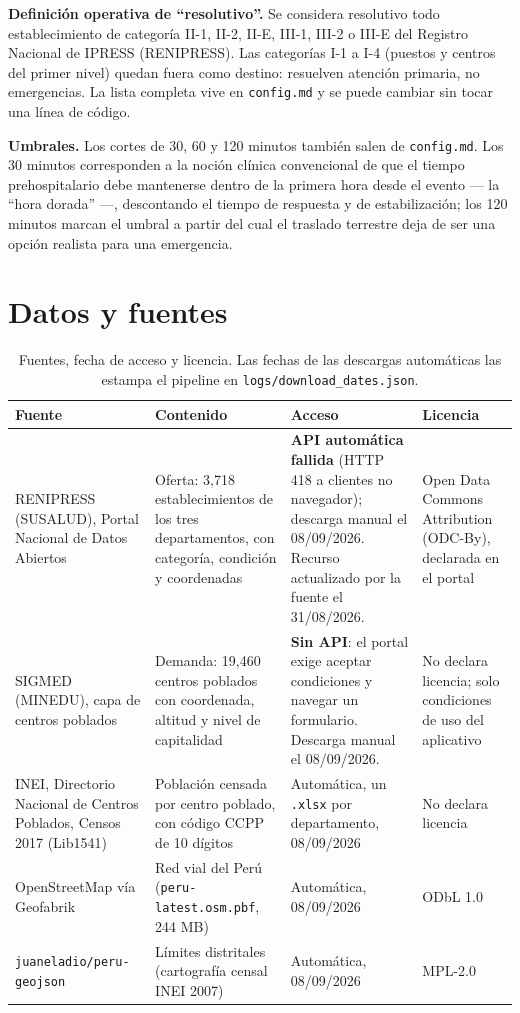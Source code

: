 \documentclass[11pt,a4paper]{article}
\begin{document}
\textbf{Definición operativa de ``resolutivo''.} Se considera resolutivo todo
establecimiento de categoría II-1, II-2, II-E, III-1, III-2 o III-E del
Registro Nacional de IPRESS (RENIPRESS). Las categorías I-1 a I-4 (puestos y
centros del primer nivel) quedan fuera como destino: resuelven atención
primaria, no emergencias. La lista completa vive en \texttt{config.md} y se
puede cambiar sin tocar una línea de código.

\textbf{Umbrales.} Los cortes de 30, 60 y 120 minutos también salen de
\texttt{config.md}. Los 30 minutos corresponden a la noción clínica
convencional de que el tiempo prehospitalario debe mantenerse dentro de la
primera hora desde el evento --- la ``hora dorada'' ---, descontando el tiempo
de respuesta y de estabilización; los 120 minutos marcan el umbral a partir
del cual el traslado terrestre deja de ser una opción realista para una
emergencia.

\section{Datos y fuentes}

\begin{table}[H]
\centering
\caption{Fuentes, fecha de acceso y licencia. Las fechas de las descargas
automáticas las estampa el pipeline en \texttt{logs/download\_dates.json}.}
\label{tab:fuentes}
\footnotesize
\begin{tabular}{p{2.9cm}p{3.5cm}p{4.6cm}p{3.5cm}}
\toprule
Fuente & Contenido & Acceso & Licencia \\
\midrule
RENIPRESS (SUSALUD), Portal Nacional de Datos Abiertos
& Oferta: 3{,}718 establecimientos de los tres departamentos, con categoría,
condición y coordenadas
& \textbf{API automática fallida} (HTTP 418 a clientes no navegador);
descarga manual el 08/09/2026. Recurso actualizado por la fuente el
31/08/2026.
& Open Data Commons Attribution (ODC-By), declarada en el portal \\
\addlinespace
SIGMED (MINEDU), capa de centros poblados
& Demanda: 19{,}460 centros poblados con coordenada, altitud y nivel de
capitalidad
& \textbf{Sin API}: el portal exige aceptar condiciones y navegar un
formulario. Descarga manual el 08/09/2026.
& No declara licencia; solo condiciones de uso del aplicativo \\
\addlinespace
INEI, Directorio Nacional de Centros Poblados, Censos 2017 (Lib1541)
& Población censada por centro poblado, con código CCPP de 10 dígitos
& Automática, un \texttt{.xlsx} por departamento, 08/09/2026
& No declara licencia \\
\addlinespace
OpenStreetMap vía Geofabrik
& Red vial del Perú (\texttt{peru-latest.osm.pbf}, 244 MB)
& Automática, 08/09/2026
& ODbL 1.0 \\
\addlinespace
\texttt{juaneladio/\allowbreak peru-geojson}
& Límites distritales (cartografía censal INEI 2007)
& Automática, 08/09/2026
& MPL-2.0 \\
\bottomrule
\end{tabular}
\end{table}
\end{document}
